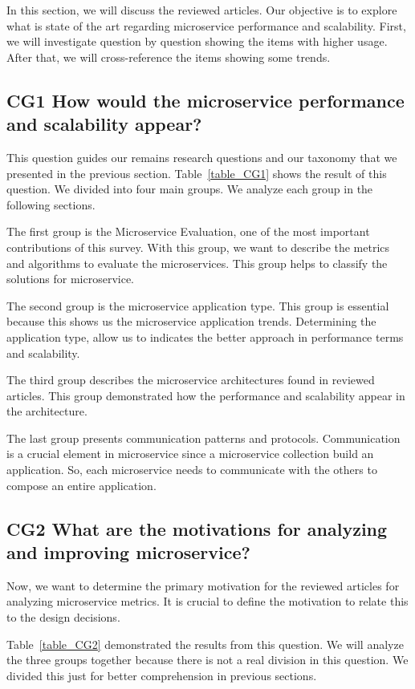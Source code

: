 In this section, we will discuss the reviewed articles. Our objective is to explore what is state of the art regarding microservice performance and scalability. First, we will investigate question by question showing the items with higher usage. After that, we will cross-reference the items showing some trends. 

\subsection{CG1 How would the microservice performance and scalability appear?}
This question guides our remains research questions and our taxonomy that we presented in the previous section. Table~\ref{table_CG1} shows the result of this question. We divided into four main groups. We analyze each group in the following sections.

The first group is the Microservice Evaluation, one of the most important contributions of this survey. With this group, we want to describe the metrics and algorithms to evaluate the microservices. This group helps to classify the solutions for microservice.

The second group is the microservice application type. This group is essential because this shows us the microservice application trends. Determining the application type, allow us to indicates the better approach in performance terms and scalability.

The third group describes the microservice architectures found in reviewed articles. This group demonstrated how the performance and scalability appear in the architecture. 

The last group presents communication patterns and protocols. Communication is a crucial element in microservice since a microservice collection build an application. So, each microservice needs to communicate with the others to compose an entire application.

\subsection{CG2 What are the motivations for analyzing and improving microservice?}

Now, we want to determine the primary motivation for the reviewed articles for analyzing microservice metrics. It is crucial to define the motivation to relate this to the design decisions. 

Table~\ref{table_CG2} demonstrated the results from this question. We will analyze the three groups together because there is not a real division in this question. We divided this just for better comprehension in previous sections. 

